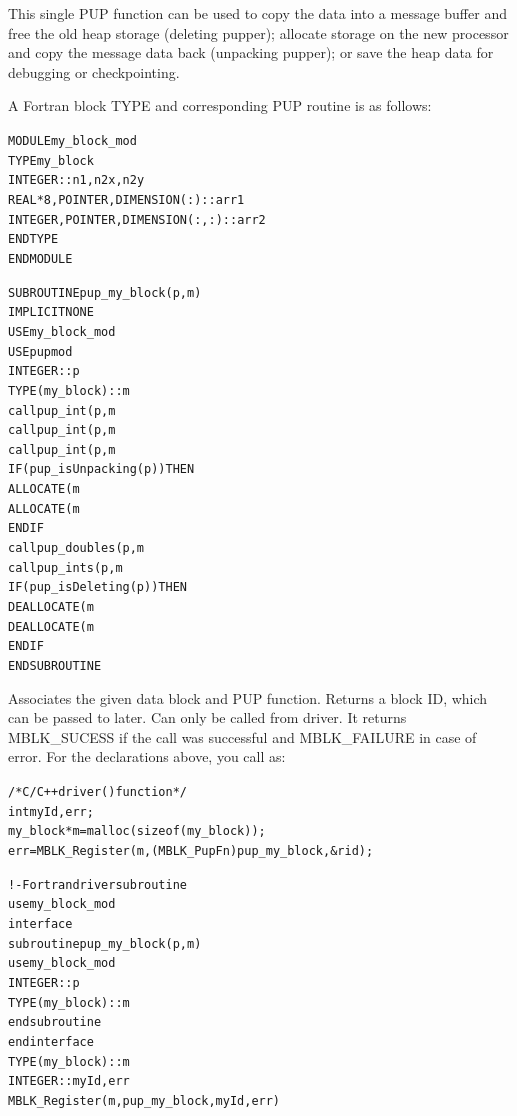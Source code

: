 \documentclass[10pt]{article}
\begin{document}
This single PUP function can be used to copy the  data into a
message buffer and free the old heap storage (deleting pupper); allocate
storage on the new processor and copy the message data back (unpacking pupper);
or save the heap data for debugging or checkpointing.

A Fortran block TYPE and corresponding PUP routine is as follows:

\begin{alltt}
     MODULE my_block_mod
       TYPE my_block
         INTEGER :: n1,n2x,n2y
         REAL*8, POINTER, DIMENSION(:) :: arr1
         INTEGER, POINTER, DIMENSION(:,:) :: arr2
       END TYPE
     END MODULE
 
     SUBROUTINE pup_my_block(p,m)
       IMPLICIT NONE
       USE my_block_mod
       USE pupmod
       INTEGER :: p
       TYPE(my_block) :: m
       call pup_int(p,m%
       call pup_int(p,m%
       call pup_int(p,m%
       IF (pup_isUnpacking(p)) THEN
         ALLOCATE(m%
         ALLOCATE(m%
       END IF
       call pup_doubles(p,m%
       call pup_ints(p,m%
       IF (pup_isDeleting(p)) THEN
         DEALLOCATE(m%
         DEALLOCATE(m%
       END IF
     END SUBROUTINE
\end{alltt}

     Associates the given data block and PUP function.  Returns a block
     ID, which can be passed to  later.  Can only be
     called from driver.  It returns MBLK\_SUCESS if the call was successful
     and MBLK\_FAILURE in case of error. For the declarations above, you call
      as:

\begin{alltt}
          /*C/C++ driver() function*/
	  int myId, err;
          my_block *m=malloc(sizeof(my_block));
          err =MBLK_Register(m,(MBLK_PupFn)pup_my_block,&rid);
 
          !- Fortran driver subroutine
          use my_block_mod
          interface
            subroutine pup_my_block(p,m)
              use my_block_mod
              INTEGER :: p
              TYPE(my_block) :: m
            end subroutine
          end interface
          TYPE(my_block) :: m
          INTEGER :: myId,err
          MBLK_Register(m,pup_my_block,myId,err)
\end{alltt}
\end{document}
